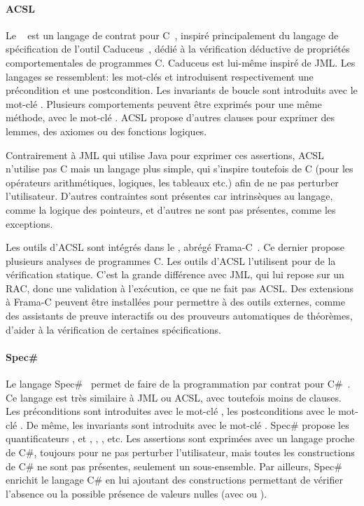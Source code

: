 \paragraph{ACSL} Le ~
est un langage de contrat pour C~, inspiré principalement du langage de
spécification de l'outil Caduceus~, dédié à la vérification
déductive de propriétés comportementales de programmes C. Caduceus est lui-même
inspiré de JML. Les langages se ressemblent: les mot-clés  et
 introduisent respectivement une précondition et une
postcondition. Les invariants de boucle sont introduits avec le mot-clé
. Plusieurs comportements peuvent être exprimés pour une même
méthode, avec le mot-clé . ACSL propose d'autres clauses pour
exprimer des lemmes, des axiomes ou des fonctions logiques.

Contrairement à JML qui utilise Java pour exprimer ces assertions, ACSL
n'utilise pas C mais un langage plus simple, qui s'inspire toutefois de C (pour
les opérateurs arithmétiques, logiques, les tableaux etc.) afin de ne pas
perturber l'utilisateur. D'autres contraintes sont présentes car intrinsèques au
langage, comme la logique des pointeurs, et d'autres ne sont pas présentes,
comme les exceptions.

Les outils d'ACSL sont intégrés dans le , abrégé Frama-C~. Ce dernier propose
plusieurs analyses de programmes C. Les outils d'ACSL l'utilisent pour de la
vérification statique. C'est la grande différence avec JML, qui lui repose sur
un RAC, donc une validation à l'exécution, ce que ne fait pas ACSL. Des
extensions à Frama-C peuvent être installées pour permettre à des outils
externes, comme des assistants de preuve interactifs ou des prouveurs
automatiques de théorèmes, d'aider à la vérification de certaines
spécifications.

\paragraph{Spec\#} Le langage Spec\#~ permet de faire de la
programmation par contrat pour C\#~. Ce langage est très similaire
à JML ou ACSL, avec toutefois moins de clauses. Les préconditions sont
introduites avec le mot-clé , les postconditions avec le mot-clé
.  De même, les invariants sont introduits avec le mot-clé
. Spec\# propose les quantificateurs ,
 et , , , 
etc. Les assertions sont exprimées avec un langage proche de C\#, toujours pour
ne pas perturber l'utilisateur, mais toutes les constructions de C\# ne sont pas
présentes, seulement un sous-ensemble. Par ailleurs, Spec\# enrichit le langage
C\# en lui ajoutant des constructions permettant de vérifier l'absence ou la
possible présence de valeurs nulles (avec \code{!} ou ).

